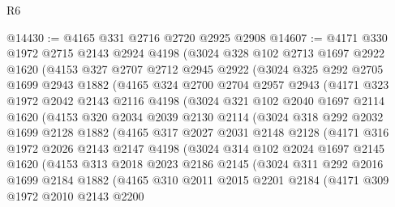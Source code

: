 \begin{lexlean}{R6}
\begin{coremodule}
@14430 := @4165 @331 @2716 @2720 @2925 @2908
@14607 := @4171
    @330
    @1972
    @2715
    @2143
    @2924
    @4198
    (@3024
      @328
      @102
      @2713
      @1697
      @2922
      @1620
      (@4153
        @327
        @2707
        @2712
        @2945
        @2922
        (@3024
          @325
          @292
          @2705
          @1699
          @2943
          @1882
          (@4165
            @324
            @2700
            @2704
            @2957
            @2943
            (@4171
              @323
              @1972
              @2042
              @2143
              @2116
              @4198
              (@3024
                @321
                @102
                @2040
                @1697
                @2114
                @1620
                (@4153
                  @320
                  @2034
                  @2039
                  @2130
                  @2114
                  (@3024
                    @318
                    @292
                    @2032
                    @1699
                    @2128
                    @1882
                    (@4165
                      @317
                      @2027
                      @2031
                      @2148
                      @2128
                      (@4171
                        @316
                        @1972
                        @2026
                        @2143
                        @2147
                        @4198
                        (@3024
                          @314
                          @102
                          @2024
                          @1697
                          @2145
                          @1620
                          (@4153
                            @313
                            @2018
                            @2023
                            @2186
                            @2145
                            (@3024
                              @311
                              @292
                              @2016
                              @1699
                              @2184
                              @1882
                              (@4165
                                @310
                                @2011
                                @2015
                                @2201
                                @2184
                                (@4171
                                  @309
                                  @1972
                                  @2010
                                  @2143
                                  @2200

\end{coremodule}
\end{lexlean}
